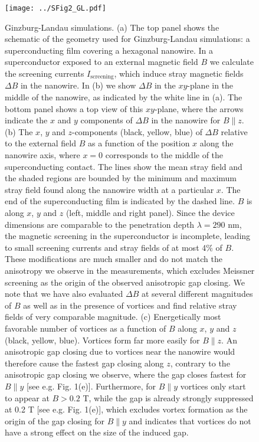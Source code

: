 \begin{figure}
\centering
\texttt{[image: ../SFig2\_GL.pdf]}
\caption{
    \label{fig:GL}Ginzburg-Landau simulations.
    (a) The top panel shows the schematic of the geometry used for Ginzburg-Landau simulations: a superconducting film covering a hexagonal nanowire. In a superconductor exposed to an external magnetic field $B$ we calculate the screening currents $I_{\mathrm{screening}}$, which induce stray magnetic fields $\Delta B$ in the nanowire. In (b) we show $\Delta B$ in the $xy$-plane in the middle of the nanowire, as indicated by the white line in (a). The bottom panel shows a top view of this $xy$-plane, where the arrows indicate the $x$ and $y$ components of $\Delta B$ in the nanowire for $B \parallel z$. (b) The $x$, $y$ and $z$-components (black, yellow, blue) of $\Delta B$ relative to the external field $B$ as a function of the position $x$ along the nanowire axis, where $x = 0$ corresponds to the middle of the superconducting contact. The lines show the mean stray field and the shaded regions are bounded by the minimum and maximum stray field found along the nanowire width at a particular $x$.  The end of the superconducting film is indicated by the dashed line. $B$ is along $x$, $y$ and $z$ (left, middle and right panel). Since the device dimensions are comparable to the penetration depth $\lambda = 290$ nm, the magnetic screening in the superconductor is incomplete, leading to small screening currents and stray fields of at most 4\% of $B$. These modifications are much smaller and do not match the anisotropy we observe in the measurements, which excludes Meissner screening as the origin of the observed anisotropic gap closing. We note that we have also evaluated $\Delta B$ at several different magnitudes of $B$ as well as in the presence of vortices and find relative stray fields of very comparable magnitude. (c) Energetically most favorable number of vortices as a function of $B$ along $x$, $y$ and $z$ (black, yellow, blue). Vortices form far more easily for $B \parallel z$. An anisotropic gap closing due to vortices near the nanowire would therefore cause the fastest gap closing along $z$, contrary to the anisotropic gap closing we observe, where the gap closes fastest for $B \parallel  y$ [see e.g. Fig. 1(e)]. Furthermore, for $B \parallel y$ vortices only start to appear at $B > 0.2$ T, while the gap is already strongly suppressed at 0.2 T [see e.g. Fig. 1(e)], which excludes vortex formation as the origin of the gap closing for $B \parallel y$ and indicates that vortices do not have a strong effect on the size of the induced gap.}
\end{figure}

